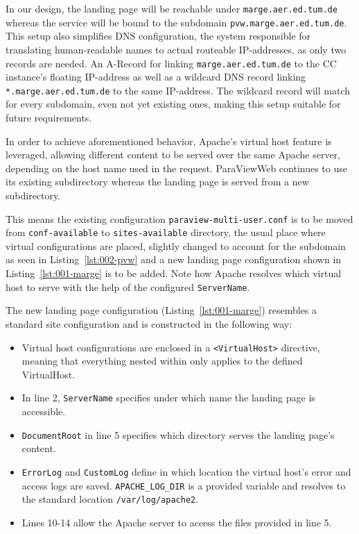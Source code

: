 In our design, the landing page will be reachable under
\texttt{marge.aer.ed.tum.de} whereas the service will be bound to the subdomain
\texttt{pvw.marge.aer.ed.tum.de}. This setup also simplifies DNS configuration,
the system responsible for translating human-readable names to actual routeable
IP-addresses, as only two records are needed. An A-Record for linking
\texttt{marge.aer.ed.tum.de} to the CC instance's floating IP-address as well as
a wildcard DNS record linking \texttt{*.marge.aer.ed.tum.de} to the same
IP-address. The wildcard record will match for every subdomain, even not yet
existing ones, making this setup suitable for future requirements. 

In order to achieve aforementioned behavior, Apache's virtual host feature is
leveraged, allowing different content to be served over the same Apache server,
depending on the host name used in the request. ParaViewWeb continues to use its
existing subdirectory whereas the landing page is served from a new
subdirectory.

This means the existing configuration \texttt{paraview-multi-user.conf} is to be
moved from \texttt{conf-available} to \texttt{sites-available} directory, the
usual place where virtual configurations are placed, slightly changed to account
for the subdomain as seen in Listing~\ref{lst:002-pvw} and a new landing page
configuration shown in Listing~\ref{lst:001-marge} is to be added. Note how
Apache resolves which virtual host to serve with the help of the configured
\texttt{ServerName}.

The new landing page configuration (Listing~\ref{lst:001-marge}) resembles a
standard site configuration and is constructed in the following way:
\begin{itemize}
    \item Virtual host configurations are enclosed in a \texttt{<VirtualHost>}
    directive, meaning that everything nested within only applies to the defined
    VirtualHost.
    \item In line 2, \texttt{ServerName} specifies under which name the
    landing page is accessible.
    \item \texttt {DocumentRoot} in line 5 specifies which directory serves
    the landing page's content.
    \item \texttt{ErrorLog} and \texttt{CustomLog} define in which
    location the virtual host's error and access logs are saved.
    \texttt{APACHE\_LOG\_DIR} is a provided variable and resolves to the
    standard location \texttt{/var/log/apache2}.
    \item Lines 10-14 allow the Apache server to access the files provided in
    line 5.
\end{itemize}

